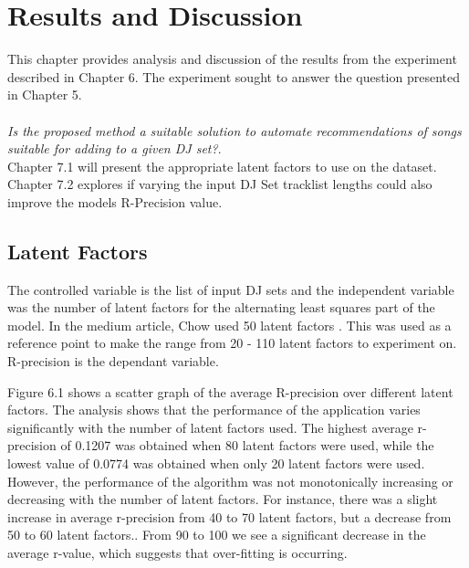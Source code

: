
\graphicspath{{Chapter6/}}

\chapter{Results and Discussion}

This chapter provides analysis and discussion of the results from the experiment described
in Chapter 6. The experiment sought to answer the question presented in Chapter 5.
\\
\\
\textit{Is the proposed method a suitable solution to automate recommendations of songs suitable for adding to a given DJ set?}.
\\

Chapter 7.1 will present the appropriate latent factors to use on the dataset. Chapter 7.2 explores if varying the input DJ Set tracklist lengths could also improve the models R-Precision value.

\section{Latent Factors}
The controlled variable is the list of input DJ sets and the independent variable was the number of latent factors for the alternating least squares part of the model. In the medium article, Chow used 50 latent factors \citep{chow_music_2020}. This was used as a reference point to make the range from 20 - 110 latent factors to experiment on. R-precision is the dependant variable.

Figure 6.1 shows a scatter graph of the average R-precision over different latent factors. The analysis shows that the performance of the application varies significantly with the number of latent factors used. The highest average r-precision of 0.1207 was obtained when 80 latent factors were used, while the lowest value of 0.0774 was obtained when only 20 latent factors were used. However, the performance of the algorithm was not monotonically increasing or decreasing with the number of latent factors. For instance, there was a slight increase in average r-precision from 40 to 70 latent factors, but a decrease from 50 to 60 latent factors.. From 90 to 100 we see a significant decrease in the average r-value, which suggests that over-fitting is occurring.

